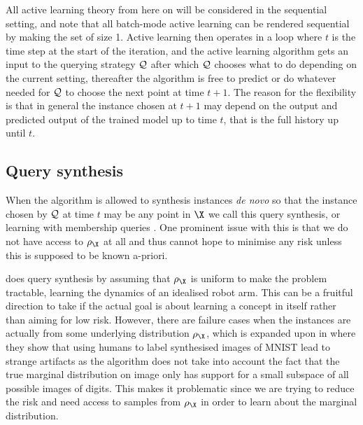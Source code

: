All active learning theory from here on will be considered in the sequential
setting, and note that all batch-mode active learning can be rendered sequential
by making the set of size 1. Active learning then operates in a loop where \(t\)
is the time step at the start of the iteration, and the active learning
algorithm gets an input to the querying strategy \(\mathcal{Q}\) after which
\(\mathcal{Q}\) chooses what to do depending on the current setting, thereafter
the algorithm is free to predict or do whatever needed for \(\mathcal{Q}\) to
choose the next point at time \(t+1\). The reason for the flexibility is that in
general the instance chosen at \(t+1\) may depend on the output and predicted
output of the trained model up to time \(t\), that is the full history up until \(t\).

\subsection{Query synthesis} When the algorithm is allowed to synthesis
instances \emph{de novo} so that the instance chosen by \(\mathcal{Q}\) at time
\(t\) may be any point in \(\X\) we call this query synthesis, or learning with
membership queries \cite{angluin88_queries_concep_learn}. One prominent issue
with this is that we do not have access to \(\rho_{\X}\) at all and thus cannot
hope to minimise any risk unless this is supposed to be known a-priori.

\cite{cohn96_activ_learn_with_statis_model} does query synthesis by assuming
that \(\rho_{\X}\) is uniform to make the problem tractable, learning the
dynamics of an idealised robot arm. This can be a fruitful direction to take if
the actual goal is about learning a concept in itself rather than aiming for low
risk. However, there are failure cases when the instances are actually from some
underlying distribution \(\rho_{\X}\), which is expanded upon in
\cite{baum92_query} where they show that using humans to label synthesised
images of MNIST lead to strange artifacts as the algorithm does not take into
account the fact that the true marginal distribution on image only has support
for a small subspace of all possible images of digits. This makes it problematic
since we are trying to reduce the risk and need access to samples from
\(\rho_{\X}\) in order to learn about the marginal distribution.


